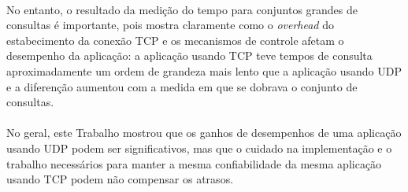 \documentclass[a4paper,10pt,oneside,final,titlepage,onecolumn]{scrartcl}
\begin{document}
\paragraph{}No entanto, o resultado da medição do tempo para conjuntos grandes de consultas é importante, pois mostra claramente como o
\emph{overhead} do estabecimento da conexão TCP e os mecanismos de controle afetam o desempenho da aplicação: a aplicação usando TCP teve tempos de consulta aproximadamente um ordem de grandeza mais lento que a aplicação usando UDP e a diferenção aumentou com a medida em que se dobrava o conjunto de consultas.
\paragraph{}No geral, este Trabalho mostrou que os ganhos de desempenhos de uma aplicação usando UDP podem ser significativos, mas que o cuidado na implementação e o trabalho necessários para manter a mesma confiabilidade da mesma aplicação usando TCP podem não compensar os atrasos.
\end{document}
